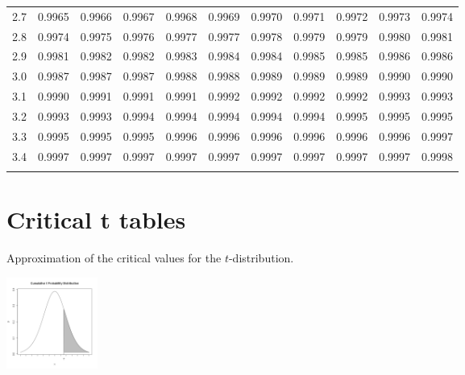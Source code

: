 \begin{tabular}{l|llllllllll}
2.7 & 0.9965 & 0.9966 & 0.9967 & 0.9968 & 0.9969 & 0.9970 & 0.9971 & 0.9972 & 0.9973 & 0.9974 \\\arrayrulecolor{light-gray}\hline\arrayrulecolor{black} 
2.8 & 0.9974 & 0.9975 & 0.9976 & 0.9977 & 0.9977 & 0.9978 & 0.9979 & 0.9979 & 0.9980 & 0.9981 \\\arrayrulecolor{light-gray}\hline\arrayrulecolor{black} 
2.9 & 0.9981 & 0.9982 & 0.9982 & 0.9983 & 0.9984 & 0.9984 & 0.9985 & 0.9985 & 0.9986 & 0.9986 \\\arrayrulecolor{light-gray}\hline\arrayrulecolor{black} 
3.0 & 0.9987 & 0.9987 & 0.9987 & 0.9988 & 0.9988 & 0.9989 & 0.9989 & 0.9989 & 0.9990 & 0.9990 \\\arrayrulecolor{light-gray}\hline\arrayrulecolor{black} 
3.1 & 0.9990 & 0.9991 & 0.9991 & 0.9991 & 0.9992 & 0.9992 & 0.9992 & 0.9992 & 0.9993 & 0.9993 \\\arrayrulecolor{light-gray}\hline\arrayrulecolor{black} 
3.2 & 0.9993 & 0.9993 & 0.9994 & 0.9994 & 0.9994 & 0.9994 & 0.9994 & 0.9995 & 0.9995 & 0.9995 \\\arrayrulecolor{light-gray}\hline\arrayrulecolor{black} 
3.3 & 0.9995 & 0.9995 & 0.9995 & 0.9996 & 0.9996 & 0.9996 & 0.9996 & 0.9996 & 0.9996 & 0.9997 \\\arrayrulecolor{light-gray}\hline\arrayrulecolor{black} 
3.4 & 0.9997 & 0.9997 & 0.9997 & 0.9997 & 0.9997 & 0.9997 & 0.9997 & 0.9997 & 0.9997 & 0.9998 \\\arrayrulecolor{light-gray}\hline\arrayrulecolor{black} 
\end{tabular}

\clearpage

\section{Critical t tables}

 Approximation of the critical values for the $t$-distribution. 

 \hfill\includegraphics[height=3.0cm]{img/tcummulativeDist}

